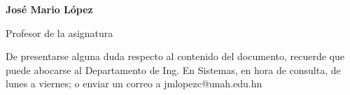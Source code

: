 \vfill
{\textbf {\normalsize José Mario López}}

{\small Profesor de la asignatura\\}

{\footnotesize 
De presentarse alguna duda respecto al contenido del documento, recuerde que puede abocarse al Departamento de Ing. En Sistemas, en hora de consulta, de lunes a viernes; o enviar un correo a jmlopezc@unah.edu.hn}
